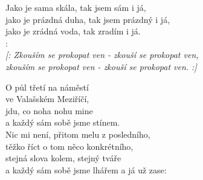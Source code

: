 
Jako je sama skála, tak jsem sám i já,\\
jako je prázdná duha, tak jsem prázdný i já,\\
jako je zrádná voda, tak zradím i já.\\

\textregistered:\\
\emph{
[: Zkouším se prokopat ven - zkouší se prokopat ven,\\
   zkouším se prokopat ven - zkouší se prokopat ven. :]\\
}

O půl třetí na náměstí\\
ve Valašském Meziříčí,\\
jdu, co noha nohu mine\\
a každý sám sobě jsme stínem.\\

Nic mi není, přitom melu z posledního,\\
těžko říct o tom něco konkrétního,\\
stejná slova kolem, stejný tváře\\
a každý sám sobě jsme lhářem a já už zase:\\

\textregistered
\textregistered

\newpage
